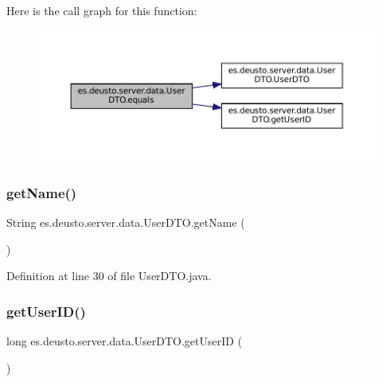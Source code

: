 Here is the call graph for this function\+:
\nopagebreak
\begin{figure}[H]
\begin{center}
\leavevmode
\includegraphics[width=350pt]{classes_1_1deusto_1_1server_1_1data_1_1_user_d_t_o_a2963ea7c4e6ae150e958abc1f0ce2bbb_cgraph}
\end{center}
\end{figure}
\mbox{\label{classes_1_1deusto_1_1server_1_1data_1_1_user_d_t_o_a3e5416e48bbbd923f0d23b87f02e3aaf}} 
\subsubsection{\texorpdfstring{getName()}{getName()}}
{\footnotesize\ttfamily String es.\+deusto.\+server.\+data.\+User\+D\+T\+O.\+get\+Name (\begin{DoxyParamCaption}{ }\end{DoxyParamCaption})}



Definition at line 30 of file User\+D\+T\+O.\+java.

\mbox{\label{classes_1_1deusto_1_1server_1_1data_1_1_user_d_t_o_ae04b78d874974f7f3307b68fa2a15210}} 
\subsubsection{\texorpdfstring{getUserID()}{getUserID()}}
{\footnotesize\ttfamily long es.\+deusto.\+server.\+data.\+User\+D\+T\+O.\+get\+User\+ID (\begin{DoxyParamCaption}{ }\end{DoxyParamCaption})}



